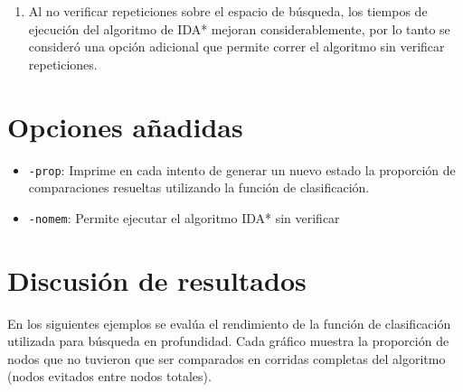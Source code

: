\documentclass[letterpaper,12pt, titlepage]{article}
\newcommand{\ms}{\texttt}
\begin{document}
\begin{enumerate}
\item Al no verificar repeticiones sobre el espacio de búsqueda,
los tiempos de ejecución del algoritmo de IDA* mejoran considerablemente,
por lo tanto se consideró una opción adicional que permite correr el
algoritmo sin verificar repeticiones.
\end{enumerate}

\section{Opciones añadidas}

\begin{itemize}
\item \ms{-prop}: Imprime en cada intento de generar un nuevo estado
la proporción de comparaciones resueltas utilizando la función de
clasificación.

\item \ms{-nomem}: Permite ejecutar el algoritmo IDA* sin verificar

\end{itemize}

\section{Discusión de resultados}
En los siguientes ejemplos se evalúa el rendimiento
de la función de clasificación utilizada para
búsqueda en profundidad. Cada gráfico muestra la proporción
de nodos que no tuvieron que ser comparados
en corridas completas del algoritmo (nodos evitados entre nodos totales).
\pagebreak
\end{document}
